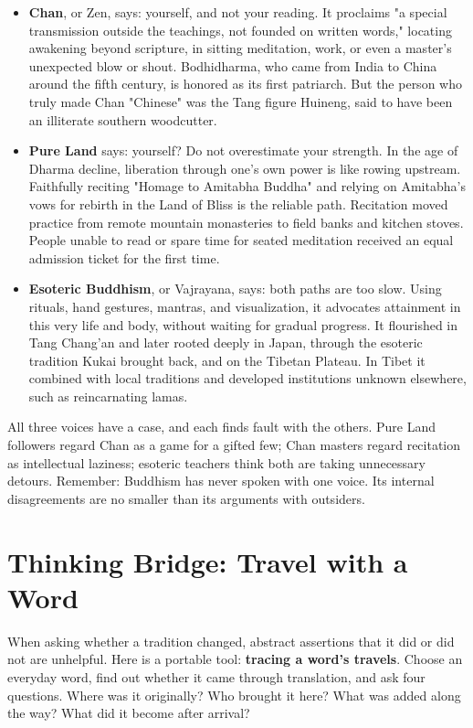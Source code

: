 \begin{itemize}
\item \textbf{Chan}, or Zen, says: yourself, and not your reading. It proclaims "a special transmission outside the teachings, not founded on written words," locating awakening beyond scripture, in sitting meditation, work, or even a master's unexpected blow or shout. Bodhidharma, who came from India to China around the fifth century, is honored as its first patriarch. But the person who truly made Chan "Chinese" was the Tang figure Huineng, said to have been an illiterate southern woodcutter.
\item \textbf{Pure Land} says: yourself? Do not overestimate your strength. In the age of Dharma decline, liberation through one's own power is like rowing upstream. Faithfully reciting "Homage to Amitabha Buddha" and relying on Amitabha's vows for rebirth in the Land of Bliss is the reliable path. Recitation moved practice from remote mountain monasteries to field banks and kitchen stoves. People unable to read or spare time for seated meditation received an equal admission ticket for the first time.
\item \textbf{Esoteric Buddhism}, or Vajrayana, says: both paths are too slow. Using rituals, hand gestures, mantras, and visualization, it advocates attainment in this very life and body, without waiting for gradual progress. It flourished in Tang Chang'an and later rooted deeply in Japan, through the esoteric tradition Kukai brought back, and on the Tibetan Plateau. In Tibet it combined with local traditions and developed institutions unknown elsewhere, such as reincarnating lamas.
\end{itemize}
All three voices have a case, and each finds fault with the others. Pure Land followers regard Chan as a game for a gifted few; Chan masters regard recitation as intellectual laziness; esoteric teachers think both are taking unnecessary detours. Remember: Buddhism has never spoken with one voice. Its internal disagreements are no smaller than its arguments with outsiders.

\section{Thinking Bridge: Travel with a Word}
When asking whether a tradition changed, abstract assertions that it did or did not are unhelpful. Here is a portable tool: \textbf{tracing a word's travels}. Choose an everyday word, find out whether it came through translation, and ask four questions. Where was it originally? Who brought it here? What was added along the way? What did it become after arrival?

